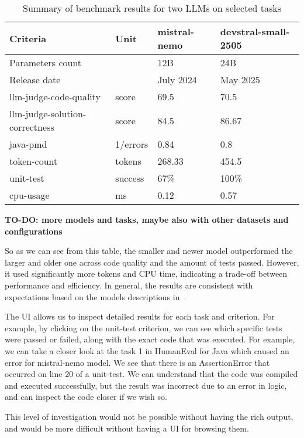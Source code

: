 \begin{table}[H]
    \centering
    \begin{tabular}{|l|l|l|l|}
        \hline
        \textbf{Criteria}	& \textbf{Unit} & \textbf{mistral-nemo}	& \textbf{devstral-small-2505} \\
        \hline
        Parameters count    &               & 12B                   & 24B \\
        Release date        &               & July 2024             & May 2025 \\
        \hline
        llm-judge-code-quality & score & 69.5 & 70.5 \\
        llm-judge-solution-correctness & score & 84.5 & 86.67 \\
        java-pmd & 1/errors & 0.84 & 0.8 \\
        token-count & tokens & 268.33 & 454.5 \\
        unit-test & success & 67\% & 100\% \\
        cpu-usage & ms & 0.12 & 0.57 \\
        \hline
    \end{tabular}
    \caption{Summary of benchmark results for two LLMs on selected tasks}
    \label{tab:benchmark-results-summary}
\end{table}

\textbf{TO-DO: more models and tasks, maybe also with other datasets and configurations}

So as we can see from this table, the smaller and newer model outperformed the larger and older one across code quality and the amount of tests passed.
However, it used significantly more tokens and CPU time, indicating a trade-off between performance and efficiency.
In general, the results are consistent with expectations based on the models descriptions in~\cite{mistralModelsBenchmarks}.

The UI allows us to inspect detailed results for each task and criterion.
For example, by clicking on the unit-test criterion, we can see which specific tests were passed or failed, along with the exact code that was executed.
For example, we can take a closer look at the task 1 in HumanEval for Java which caused an error for mistral-nemo model.
We see that there is an AssertionError that occurred on line 20 of a unit-test.
We can understand that the code was compiled and executed successfully, but the result was incorrect due to an error in logic, and can inspect the code closer if we wish so.

This level of investigation would not be possible without having the rich output, and would be more difficult without having a UI for browsing them.

